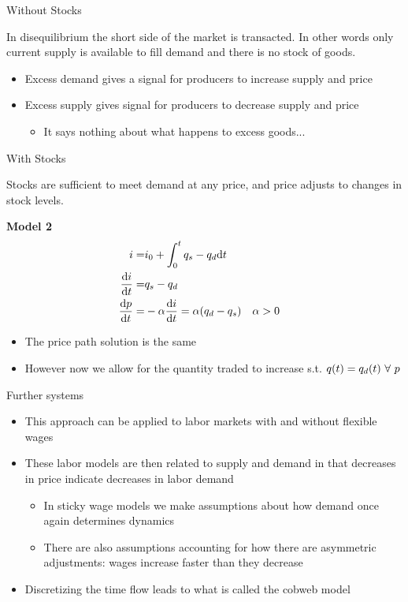 \documentclass{article}
\begin{document}
Without Stocks
	\begin{assumption}
		In disequilibrium the short side of the market is transacted. In other words only current supply is available to fill demand and there is no stock of goods.
	\end{assumption}
	\begin{itemize}
		\item Excess demand gives a signal for producers to increase supply and price
		\item Excess supply gives signal for producers to decrease supply and price
		\begin{itemize}
			\item It says nothing about what happens to excess goods...
		\end{itemize}
	\end{itemize}	

With Stocks
	\begin{assumption}
		Stocks are sufficient to meet demand at any price, and price adjusts to changes in stock levels.
	\end{assumption}
	\textbf{Model 2}
	\begin{align*}
		i =& i_0 + \int_0^t{q_s - q_d}\mathrm{d} t\\
		\frac{\mathrm{d} i}{\mathrm{d} t} = & q_s - q_d \\
		\frac{\mathrm{d} p}{\mathrm{d} t} =& -\alpha\frac{\mathrm{d} i}{\mathrm{d} t} = \alpha(q_d - q_s) && \alpha > 0
	\end{align*}	
	\begin{itemize}
		\item The price path solution is the same
		\item However now we allow for the quantity traded to increase s.t. $q(t) = q_d(t)\ \forall\ p$
	\end{itemize}

Further systems
	\begin{itemize}
		\item This approach can be applied to labor markets with and without flexible wages
		\item These labor models are then related to supply and demand in that decreases in price indicate decreases in labor demand
		\begin{itemize}
			\item In sticky wage models we make assumptions about how demand once again determines dynamics
			\item There are also assumptions accounting for how there are asymmetric adjustments: wages increase faster than they decrease
		\end{itemize}
		\item Discretizing the time flow leads to what is called the cobweb model
	\end{itemize}
\end{document}
